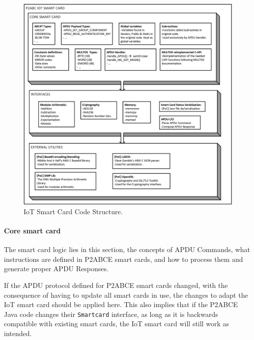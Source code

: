 
\begin{figure}[bth]
	\begin{center}
		\includegraphics[width=\linewidth]{gfx/IoTCScomponents-bw}
	\end{center}
	\caption{IoT Smart Card Code Structure.}
	\label{fig:IoTCScomponents-bw}
\end{figure}


\hfil

\paragraph{Core smart card}

The smart card logic lies in this section, the concepts of APDU Commands, what instructions are defined in P2ABCE smart cards, and how to process them and generate proper APDU Responses.

If the APDU protocol defined for P2ABCE smart cards changed, with the consequence of having to update all smart cards in use, the changes to adapt the IoT smart card should be applied here. This also implies that if the P2ABCE Java code changes their \texttt{Smartcard} interface, as long as it is backwards compatible with existing smart cards, the IoT smart card will still work as intended.

